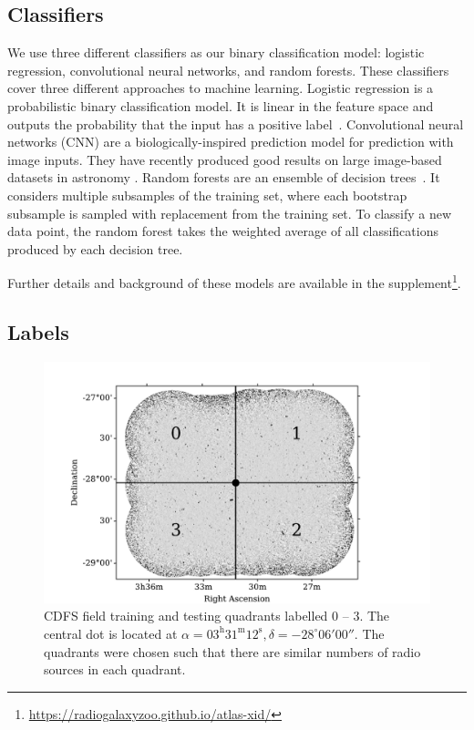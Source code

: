 \documentclass[fleqn,usenatbib,usedcolumn]{mnras}
\begin{document}
  \subsection{Classifiers}\label{sec:classifiers}

    We use three different classifiers as our binary classification model:
    logistic regression, convolutional neural networks, and random forests.
    These classifiers cover three different approaches to machine learning.
    Logistic regression is a probabilistic binary classification model.
    It is linear in the
    feature space and outputs the probability that the input has a positive
    label~\citep[Chap. 4]{bishop06ml}.
    Convolutional neural networks (CNN) are a biologically-inspired
    prediction model for prediction with image inputs.
    They have recently produced good results on large image-based datasets
    in astronomy \citep[e.g.][Lukic et al. in prep]{dieleman15cnn}.
    Random forests are an ensemble of decision
    trees~\citep{breiman01random-forest}. It considers multiple subsamples
    of the training set, where each bootstrap subsample is sampled with
    replacement from the training set. To classify a new data
    point, the random forest takes the weighted average of all
    classifications produced by each decision tree.

    Further details and background of these models are available in the
    supplement\footnote{\url{https://radiogalaxyzoo.github.io/atlas-xid/}}.

  \subsection{Labels}\label{sec:labels}
    \begin{figure}
      \centering
      \includegraphics[width=\columnwidth]{images/quadrants.pdf}
      \caption{CDFS field training and testing quadrants labelled 0 -- 3. The
        central dot is located at $\alpha = 03^\text{h}31^\text{m}12^\text{s},
        \delta = -28^\circ{}06'00''$. The quadrants were chosen such that
        there are similar numbers of radio sources in each
        quadrant.\label{fig:quadrants}}
    \end{figure}
\end{document}
